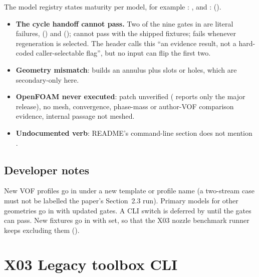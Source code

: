The model registry states maturity per model, for example : , and :  ().
\begin{itemize}
\item \textbf{The cycle handoff cannot pass.} Two of the nine gates in  are literal failures,  () and  ();  cannot pass with the shipped fixtures;  fails whenever regeneration is selected. The header calls this ``an evidence result, not a hard-coded caller-selectable flag'', but no input can flip the first two.
\item \textbf{Geometry mismatch}:  builds an annulus plus slots or holes, which are secondary-only here.
\item \textbf{OpenFOAM never executed}: patch  unverified ( reports only the major release), no mesh, convergence, phase-mass or author-VOF comparison evidence, internal passage not meshed.
\item \textbf{Undocumented verb}: README's command-line section does not mention .
\end{itemize}

\subsection{Developer notes}

New VOF profiles go in  under a new template or profile name (a two-stream case must not be labelled the paper's Section~2.3 run). Primary models for other geometries go in  with updated gates. A CLI  switch is deferred by  until the gates can pass. New fixtures go in  with  set, so that the X03 nozzle benchmark runner keeps excluding them ().

\section{X03 Legacy toolbox CLI}\label{sec:x03-legacy}

